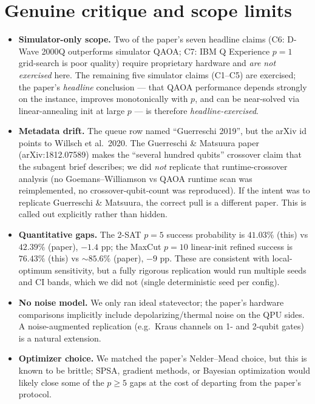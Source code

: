 \documentclass[11pt]{article}
\begin{document}
\section{Genuine critique and scope limits}
\label{sec:critique}

\begin{itemize}
  \item \textbf{Simulator-only scope.} Two of the paper's seven headline claims
        (C6: D-Wave 2000Q outperforms simulator QAOA; C7: IBM Q Experience
        $p{=}1$ grid-search is poor quality) require proprietary hardware and
        \emph{are not exercised} here. The remaining five simulator claims
        (C1--C5) are exercised; the paper's \emph{headline} conclusion --- that
        QAOA performance depends strongly on the instance, improves monotonically
        with $p$, and can be near-solved via linear-annealing init at large $p$
        --- is therefore \emph{headline-exercised}.
  \item \textbf{Metadata drift.} The queue row named ``Guerreschi 2019'', but
        the arXiv id points to Willsch et al.\ 2020. The Guerreschi \& Matsuura
        paper (arXiv:1812.07589) makes the ``several hundred qubits'' crossover
        claim that the subagent brief describes; we did \emph{not} replicate
        that runtime-crossover analysis (no Goemans--Williamson vs QAOA
        runtime scan was reimplemented, no crossover-qubit-count was
        reproduced). If the intent was to replicate Guerreschi \& Matsuura,
        the correct pull is a different paper. This is called out explicitly
        rather than hidden.
  \item \textbf{Quantitative gaps.} The 2-SAT $p{=}5$ success probability is
        $41.03\%$ (this) vs $42.39\%$ (paper), $-1.4$ pp; the MaxCut $p{=}10$
        linear-init refined success is $76.43\%$ (this) vs $\sim 85.6\%$
        (paper), $-9$ pp. These are consistent with local-optimum sensitivity,
        but a fully rigorous replication would run multiple seeds and CI
        bands, which we did not (single deterministic seed per config).
  \item \textbf{No noise model.} We only ran ideal statevector; the paper's
        hardware comparisons implicitly include depolarizing/thermal noise
        on the QPU sides. A noise-augmented replication (e.g.\ Kraus channels
        on 1- and 2-qubit gates) is a natural extension.
  \item \textbf{Optimizer choice.} We matched the paper's Nelder--Mead choice,
        but this is known to be brittle; SPSA, gradient methods, or Bayesian
        optimization would likely close some of the $p\geq 5$ gaps at the cost
        of departing from the paper's protocol.
\end{itemize}
\end{document}
